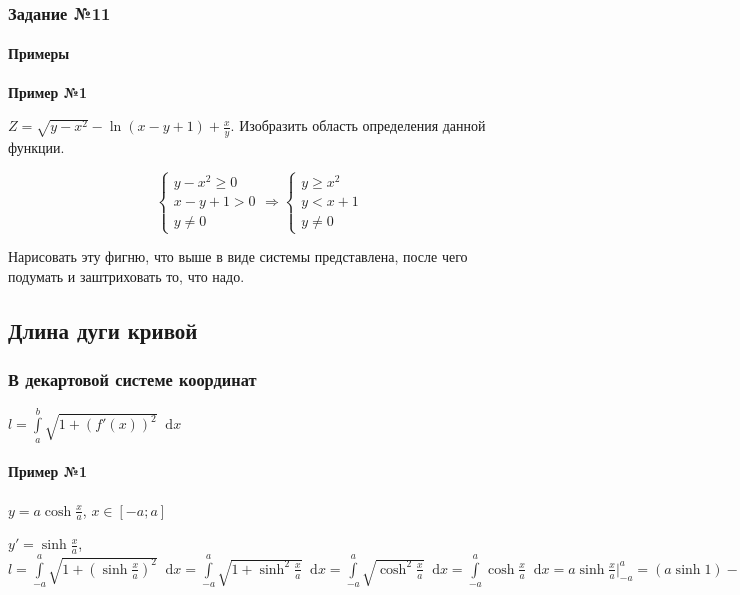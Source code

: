 \documentclass{article}
\newcommand*\diff{\mathop{}\!\mathrm{d}}
\begin{document}
\subsubsection{Задание №11}

\paragraph{Примеры}

\textbf{Пример №1}

$Z = \sqrt{y - x^2} - \ln (x - y + 1) + \frac{x}{y}$. Изобразить область определения данной функции.

\begin{equation}
	\begin{cases}
		y - x^2 \ge 0 \\
		x - y + 1 > 0 \\
		y \ne 0
	\end{cases} \Longrightarrow
	\begin{cases}
		y \ge x^2 \\
		y < x + 1 \\
		y \ne 0
	\end{cases}
\end{equation}

Нарисовать эту фигню, что выше в виде системы представлена, после чего подумать и заштриховать то, что надо.

\subsection{Длина дуги кривой}

\subsubsection{В декартовой системе координат}

$l = \int\limits_{a}^{b} \sqrt{1 + (f'(x))^2} \diff x$

\paragraph{Пример №1}

$y = a \cosh \frac{x}{a}$, $x \in [-a; a]$

$y' = \sinh \frac{x}{a}$, $l = \int\limits_{-a}^{a} \sqrt{1 + (\sinh \frac{x}{a})^2} \diff x = \int\limits_{-a}^{a} \sqrt{1 + \sinh^2 \frac{x}{a}} \diff x = \int\limits_{-a}^{a} \sqrt{\cosh^2 \frac{x}{a}} \diff x = \int\limits_{-a}^{a} \cosh \frac{x}{a} \diff x = a \sinh \frac{x}{a} \bigg|_{-a}^{a} = (a \sinh 1) - (a \sinh (-1)) = 2 a \sinh 1$
\end{document}
